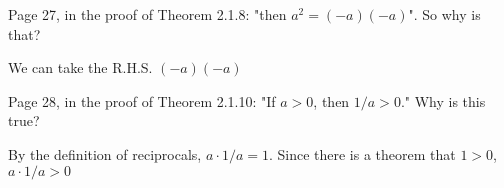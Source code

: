\documentclass[boxes, qed]{homework}
\begin{document}
\newenvironment{amatrix}[1]{%
  \left[\begin{array}{@{}*{#1}{c}|c@{}}
}{%
  \end{array}\right]
}

\newenvironment{augmatrix}[1]{%
  \left[\begin{array}{#1}
}{%
  \end{array}\right]
}

\begin{problem}Page 27, in the proof of Theorem 2.1.8: 
  "then $a^2=(-a)(-a)$". So why is that?
\end{problem}
\begin{solution}We can take the R.H.S. $(-a)(-a)$
\end{solution}
\begin{problem}Page 28, in the proof of Theorem 2.1.10: 
  "If $a>0$, then $1/a>0$." Why is this true?
\end{problem}
\begin{solution}By the definition of reciprocals,
  $a\cdot{1/a}=1$. Since there is a theorem that
  $1>0$, $a\cdot{1/a}>0$
\end{solution}
\end{document}
